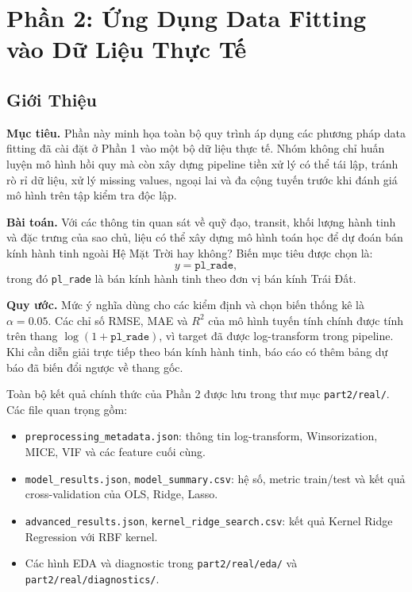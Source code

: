 \section{Phần 2: Ứng Dụng Data Fitting vào Dữ Liệu Thực Tế}

\subsection{Giới Thiệu}

\textbf{Mục tiêu.} Phần này minh họa toàn bộ quy trình áp dụng các phương pháp data fitting đã
cài đặt ở Phần 1 vào một bộ dữ liệu thực tế. Nhóm không chỉ huấn luyện mô hình hồi quy mà còn xây
dựng pipeline tiền xử lý có thể tái lập, tránh rò rỉ dữ liệu, xử lý missing values, ngoại lai và
đa cộng tuyến trước khi đánh giá mô hình trên tập kiểm tra độc lập.

\textbf{Bài toán.} Với các thông tin quan sát về quỹ đạo, transit, khối lượng hành tinh và đặc
trưng của sao chủ, liệu có thể xây dựng mô hình toán học để dự đoán bán kính hành tinh ngoài Hệ
Mặt Trời hay không? Biến mục tiêu được chọn là:
\begin{equation}
    y = \texttt{pl\_rade},
\end{equation}
trong đó \texttt{pl\_rade} là bán kính hành tinh theo đơn vị bán kính Trái Đất.

\textbf{Quy ước.} Mức ý nghĩa dùng cho các kiểm định và chọn biến thống kê là
$\alpha = 0.05$. Các chỉ số RMSE, MAE và $R^2$ của mô hình tuyến tính chính được tính trên thang
$\log(1+\texttt{pl\_rade})$, vì target đã được log-transform trong pipeline. Khi cần diễn giải
trực tiếp theo bán kính hành tinh, báo cáo có thêm bảng dự báo đã biến đổi ngược về thang gốc.

Toàn bộ kết quả chính thức của Phần 2 được lưu trong thư mục \texttt{part2/real/}. Các file quan
trọng gồm:
\begin{itemize}
    \item \texttt{preprocessing\_metadata.json}: thông tin log-transform, Winsorization, MICE,
          VIF và các feature cuối cùng.
    \item \texttt{model\_results.json}, \texttt{model\_summary.csv}: hệ số, metric train/test và
          kết quả cross-validation của OLS, Ridge, Lasso.
    \item \texttt{advanced\_results.json}, \texttt{kernel\_ridge\_search.csv}: kết quả Kernel
          Ridge Regression với RBF kernel.
    \item Các hình EDA và diagnostic trong \texttt{part2/real/eda/} và
          \texttt{part2/real/diagnostics/}.
\end{itemize}

